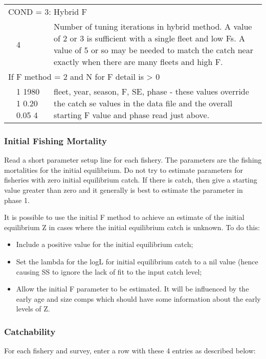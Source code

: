 \begin{center}
\begin{longtable}{p{1cm} p{3cm} p{11.3cm}}
		   \multicolumn{3}{l}{COND = 3: Hybrid F}\\
		   & 4 & Number of tuning iterations in hybrid method. A value of 2 or 3 is sufficient with a single fleet and low Fs.  A value of 5 or so may be needed to match the catch near exactly when there are many fleets and high F. \\
		   \hline
		   \multicolumn{3}{l}{If F method = 2 and N for F detail is > 0}\\
		   & 1 1980 1 0.20 0.05 4 & fleet, year, season, F, SE, phase - these values override the catch se values in the data file and the overall starting F value and phase read just above.\\
		   \hline
	\end{longtable}
\end{center}

\subsubsection{Initial Fishing Mortality}
Read a short parameter setup line for each fishery.  The parameters are the fishing mortalities for the initial equilibrium.  Do not try to estimate parameters for fisheries with zero initial equilibrium catch.  If there is catch, then give a starting value greater than zero and it generally is best to estimate the parameter in phase 1.

It is possible to use the initial F method to achieve an estimate of the initial equilibrium Z in cases where the initial equilibrium catch is unknown.  To do this:
\begin{itemize}
	\item Include a positive value for the initial equilibrium catch;
	\item Set the lambda for the logL for initial equilibrium catch to a nil value (hence causing SS to ignore the lack of fit to the input catch level;
	\item Allow the initial F parameter to be estimated.  It will be influenced by the early age and size comps which should have some information about the early levels of Z.
\end{itemize}

\hypertarget{Qsetup}{}
\subsubsection{Catchability}
For each fishery and survey, enter a row with these 4 entries as described below:

